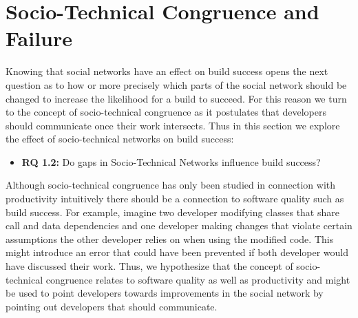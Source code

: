 \section{Socio-Technical Congruence and Failure}
\label{chap:stc-net2}
Knowing that social networks have an effect on build success opens the next question as to how or more precisely which parts of the social network should be changed to increase the likelihood for a build to succeed.
For this reason we turn to the concept of socio-technical congruence as it postulates that developers should communicate once their work intersects.
Thus in this section we explore the effect of socio-technical networks on build success:

\begin{itemize}
  \item\textbf{RQ 1.2:} Do gaps in Socio-Technical Networks influence build success?
\end{itemize}

Although socio-technical congruence has only been studied in connection with productivity intuitively there should be a connection to software quality such as build success.
For example, imagine two developer modifying classes that share call and data dependencies and one developer making changes that violate certain assumptions the other developer relies on when using the modified code.
This might introduce an error that could have been prevented if both developer would have discussed their work.
Thus, we hypothesize that the concept of socio-technical congruence relates to software quality as well as productivity and might be used to point developers towards improvements in the social network by pointing out developers that should communicate.




